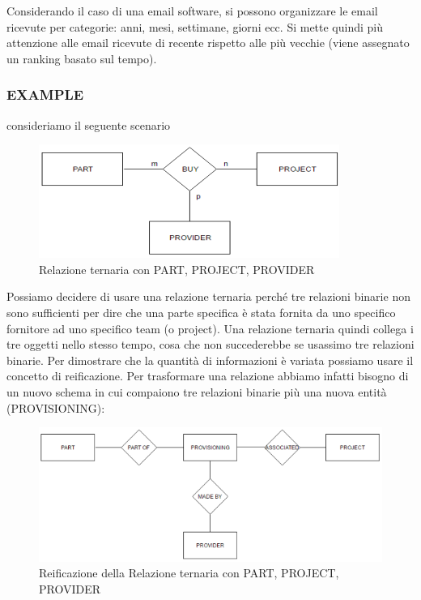 Considerando il caso di una email software, si possono organizzare le email ricevute per categorie: anni, mesi, settimane, giorni ecc. Si mette quindi più attenzione alle email ricevute di recente rispetto alle più vecchie (viene assegnato un ranking basato sul tempo). 

\subsubsection{EXAMPLE}

consideriamo il seguente scenario 

\begin{center}
\begin{figure}[H]
\centering
\includegraphics[scale=1]{figures/pppbuy.png}
\caption{Relazione ternaria con PART, PROJECT, PROVIDER}
\end{figure}
\end{center}

Possiamo decidere di usare una relazione ternaria perché tre relazioni binarie non sono sufficienti per dire che una parte specifica è stata fornita da uno specifico fornitore ad uno specifico team (o project).  
Una relazione ternaria quindi collega i tre oggetti nello stesso tempo, cosa che non succederebbe se usassimo tre relazioni binarie. Per dimostrare che la quantità di informazioni è variata possiamo usare il concetto di reificazione. Per trasformare una relazione abbiamo infatti bisogno di un nuovo schema in cui compaiono tre relazioni binarie più una nuova entità (PROVISIONING): 

\begin{center}
\begin{figure}[H]
\centering
\includegraphics[scale=1]{figures/ppp_extended.png}
\caption{Reificazione della Relazione ternaria con PART, PROJECT, PROVIDER}
\end{figure}
\end{center}

